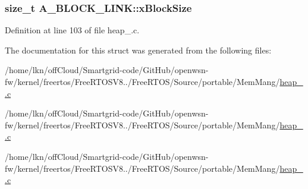 \subsubsection[{\texorpdfstring{x\+Block\+Size}{xBlockSize}}]{\setlength{\rightskip}{0pt plus 5cm}size\+\_\+t A\+\_\+\+B\+L\+O\+C\+K\+\_\+\+L\+I\+N\+K\+::x\+Block\+Size}\hypertarget{struct_a___b_l_o_c_k___l_i_n_k_ad5dcf5df03d8be6186c567be9e2c657b}{}\label{struct_a___b_l_o_c_k___l_i_n_k_ad5dcf5df03d8be6186c567be9e2c657b}


Definition at line 103 of file heap\+\_.\+c.



The documentation for this struct was generated from the following files\+:\begin{DoxyCompactItemize}
\item 
/home/lkn/off\+Cloud/\+Smartgrid-\/code/\+Git\+Hub/openwsn-\/fw/kernel/freertos/\+Free\+R\+T\+O\+S\+V8../\+Free\+R\+T\+O\+S/\+Source/portable/\+Mem\+Mang/\hyperlink{heap__2_8c}{heap\+\_.\+c}\item 
/home/lkn/off\+Cloud/\+Smartgrid-\/code/\+Git\+Hub/openwsn-\/fw/kernel/freertos/\+Free\+R\+T\+O\+S\+V8../\+Free\+R\+T\+O\+S/\+Source/portable/\+Mem\+Mang/\hyperlink{heap__4_8c}{heap\+\_.\+c}\item 
/home/lkn/off\+Cloud/\+Smartgrid-\/code/\+Git\+Hub/openwsn-\/fw/kernel/freertos/\+Free\+R\+T\+O\+S\+V8../\+Free\+R\+T\+O\+S/\+Source/portable/\+Mem\+Mang/\hyperlink{heap__5_8c}{heap\+\_.\+c}\end{DoxyCompactItemize}
